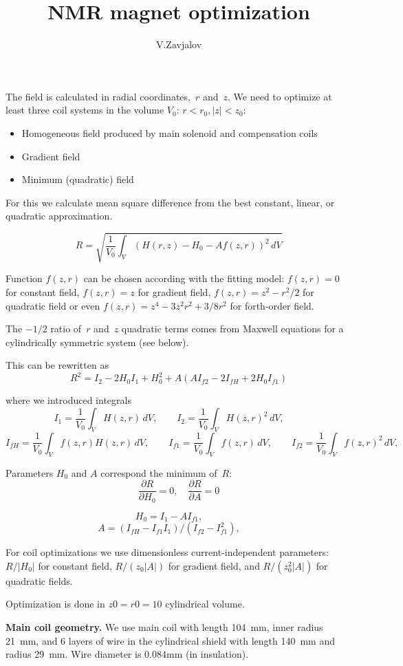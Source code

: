 \documentclass[a4paper]{article}
\title{NMR magnet optimization}
\author{V.Zavjalov}
\begin{document}
\maketitle

The field is calculated in radial coordinates,~$r$ and~$z$.
We need to optimize at least three coil systems in the volume $V_0$: $r<r_0, |z|<z_0$:
\begin{itemize}
\item Homogeneous field produced by main solenoid and compensation coils
\item Gradient field
\item Minimum (quadratic) field
\end{itemize}
For this we calculate mean square difference from the best
constant, linear, or quadratic approximation.

$$ R = \sqrt{\frac{1}{V_0}\int_V(H(r,z) - H_0 - A f(z,r))^2\,dV}
$$

Function $f(z,r)$ can be chosen according with the fitting model:
$f(z,r)=0$ for constant field, $f(z,r)=z$ for gradient field, 
$f(z,r)=z^2-r^2/2$ for quadratic field or even $f(z,r) = z^4 - 3z^2r^2 + 3/8r^2$
for forth-order field.

The $-1/2$ ratio of~$r$ and~$z$ quadratic terms comes from Maxwell equations
for a cylindrically symmetric system (see below).


This can be rewritten as
$$ R^2
 = I_2 - 2H_0 I_1 + H_0^2 + A( A I_{f2} - 2I_{fH} + 2H_0 I_{f1})
$$



where we introduced integrals
$$
I_1 = \frac{1}{V_0}\int_V H(z,r)\, dV,\qquad
I_2 = \frac{1}{V_0}\int_V H(z,r)^2\, dV,\qquad
$$
$$
I_{fH} = \frac{1}{V_0}\int_V f(z,r) H(z,r)\, dV,\qquad
I_{f1} = \frac{1}{V_0}\int_V f(z,r)  \, dV,\qquad
I_{f2} = \frac{1}{V_0}\int_V f(z,r)^2\, dV,\qquad
$$

Parameters $H_0$ and $A$ correspond the minimum of~$R$:
$$
\frac{\partial R}{\partial H_0} = 0,\quad
\frac{\partial R}{\partial A} = 0
$$

$$
H_0 = I_1 - A I_{f1},\qquad
$$
$$
A = (I_{fH} - I_{f1} I_1)/(I_{f2} - I_{f1}^2),\qquad
$$

For coil optimizations we use dimensionless current-independent
parameters:
$R/|H_0|$ for constant field, $R/(z_0|A|)$ for gradient field, and
$R/(z_0^2|A|)$ for quadratic fields.

Optimization is done in $z0=r0=10$ cylindrical volume.

{\bf Main coil geometry.} We use main coil with length 104~mm, inner radius
21~mm, and 6 layers of wire in the cylindrical shield with length 140~mm
and radius 29~mm. Wire diameter is 0.084mm (in insulation).
\end{document}
